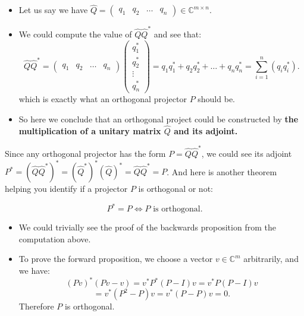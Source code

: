 \begin{itemize}
  \item Let us say we have $\hat{Q} = \begin{pmatrix} q_1 & q_2 & \ldots & q_n \end{pmatrix} \in \mathbb{C}^{m \times  n}$.
\item We could compute the value of $\hat{Q}\hat{Q}^{*}$ and see that:
  \[
    \hat{Q}\hat{Q}^* = \begin{pmatrix} q_1 & q_2 & \ldots & q_n \end{pmatrix} \begin{pmatrix} q_1^{*}\\ q_2^{*} \\\vdots\\ q_n^{*} \end{pmatrix} = q_1q_1^* + q_2q_2^* + \ldots + q_nq_n^{*} =  \sum_{i=1}^{n} (q_iq_i^{*})
  .\]
  which is exactly what an orthogonal projector \(P\) should be.
  \item So here we conclude that an orthogonal project could be constructed by \textbf{the multiplication of a unitary matrix \(\hat{Q}\) and its adjoint.}\checked

\end{itemize}
Since any orthogonal projector has the form $P = \hat{Q}\hat{Q}^*$, we could see its adjoint $P^* = (\hat{Q}\hat{Q}^*)^* = (\hat{Q}^*)^*(\hat{Q})^* = \hat{Q}\hat{Q}^* = P$. And here is another theorem helping you identify if a projector \(P\) is orthogonal or not:
\begin{theorem}
  \[
    P^* = P \iff P  \text{ is orthogonal}
    .\]
\end{theorem}
\begin{itemize}
\item We could trivially see the proof of the backwards proposition from the computation above.
\item To prove the forward proposition, we choose a vector $v \in \mathbb{C}^{m}$ arbitrarily, and we have:
  \[
    (Pv)^{*}(Pv - v) = v^*P^*(P - I)v = v^*P(P - I)v 
  \]
  \[
  = v^*(P^2 - P)v = v^*(P - P)v = 0 
  .\] 
  Therefore $P$ is orthogonal. \checked
\end{itemize}

